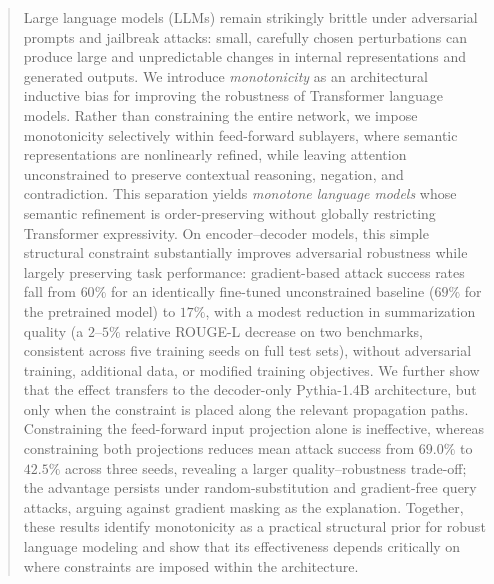 \documentclass{article}
\theoremstyle{plain}
\theoremstyle{definition}
\theoremstyle{remark}
\begin{document}
\begin{abstract}

Large language models (LLMs) remain strikingly brittle under adversarial
prompts and jailbreak attacks: small, carefully chosen perturbations can
produce large and unpredictable changes in internal representations and
generated outputs. We introduce \emph{monotonicity} as an architectural
inductive bias for improving the robustness of Transformer language models.
Rather than constraining the entire network, we impose monotonicity selectively
within feed-forward sublayers, where semantic representations are nonlinearly
refined, while leaving attention unconstrained to preserve contextual
reasoning, negation, and contradiction. This separation yields
\emph{monotone language models} whose semantic refinement is order-preserving
without globally restricting Transformer expressivity.
On encoder--decoder models, this simple structural constraint substantially
improves adversarial robustness while largely preserving task performance:
gradient-based attack success rates fall from $60\%$ for an identically
fine-tuned unconstrained baseline ($69\%$ for the pretrained model) to $17\%$,
with a modest reduction in summarization quality (a $2$--$5\%$ relative ROUGE-L
decrease on two benchmarks, consistent across five training seeds on full test sets), without adversarial
training, additional data, or modified training objectives. We further show that
the effect transfers to the decoder-only Pythia-1.4B architecture, but only when
the constraint is placed along the relevant propagation paths. Constraining the
feed-forward input projection alone is ineffective, whereas constraining both
projections reduces mean attack success from $69.0\%$ to $42.5\%$ across three
seeds, revealing a larger quality--robustness trade-off; the advantage persists
under random-substitution and gradient-free query attacks, arguing against
gradient masking as the explanation. Together, these results identify
monotonicity as a practical structural prior for robust language modeling and
show that its effectiveness depends critically on where constraints are imposed
within the architecture. %

\end{abstract}
\end{document}
